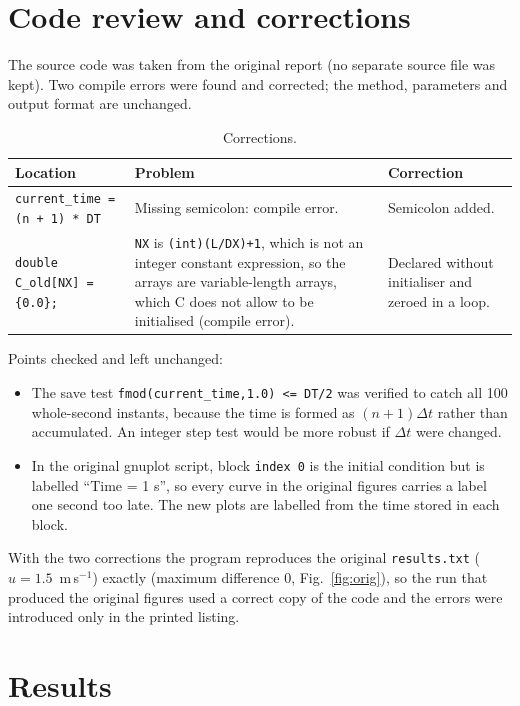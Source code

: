 \section{Code review and corrections}
The source code was taken from the original report (no separate source file was kept). Two compile errors were found and corrected; the method, parameters and output format are unchanged.
\begin{table}[H]\centering\small
\begin{tabular}{p{4.2cm}p{6.2cm}p{4.6cm}}\toprule
Location & Problem & Correction\\\midrule
\texttt{current\_time = (n + 1) * DT} & Missing semicolon: compile error. & Semicolon added.\\
\texttt{double C\_old[NX] = \{0.0\};} & \texttt{NX} is \texttt{(int)(L/DX)+1}, which is not an integer constant expression, so the arrays are variable-length arrays, which C does not allow to be initialised (compile error). & Declared without initialiser and zeroed in a loop.\\\bottomrule
\end{tabular}\caption{Corrections.}\end{table}
Points checked and left unchanged:
\begin{itemize}
\item The save test \texttt{fmod(current\_time,1.0) <= DT/2} was verified to catch all 100 whole-second instants, because the time is formed as $(n+1)\Delta t$ rather than accumulated. An integer step test would be more robust if $\Delta t$ were changed.
\item In the original gnuplot script, block \texttt{index 0} is the initial condition but is labelled ``Time = 1 s'', so every curve in the original figures carries a label one second too late. The new plots are labelled from the time stored in each block.
\end{itemize}
With the two corrections the program reproduces the original \texttt{results.txt} ($u=1.5$~m\,s$^{-1}$) exactly (maximum difference 0, Fig.~\ref{fig:orig}), so the run that produced the original figures used a correct copy of the code and the errors were introduced only in the printed listing.

\section{Results}
